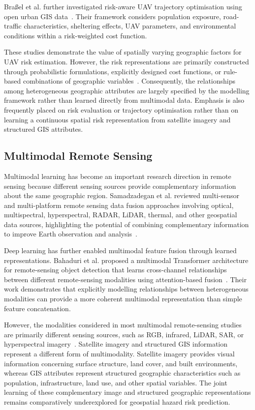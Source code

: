 \documentclass[sigconf, review=true]{acmart}
\begin{document}
Bra{\ss}el et al. further investigated risk-aware UAV trajectory optimisation using open urban GIS data~\cite{brassel2025riskaware}. Their framework considers population exposure, road-traffic characteristics, sheltering effects, UAV parameters, and environmental conditions within a risk-weighted cost function.

These studies demonstrate the value of spatially varying geographic factors for UAV risk estimation. However, the risk representations are primarily constructed through probabilistic formulations, explicitly designed cost functions, or rule-based combinations of geographic variables~\cite{primatesta2020groundrisk,zhou2025riskbased,brassel2025riskaware}. Consequently, the relationships among heterogeneous geographic attributes are largely specified by the modelling framework rather than learned directly from multimodal data. Emphasis is also frequently placed on risk evaluation or trajectory optimisation rather than on learning a continuous spatial risk representation from satellite imagery and structured GIS attributes.

\subsection{Multimodal Remote Sensing}

Multimodal learning has become an important research direction in remote sensing because different sensing sources provide complementary information about the same geographic region. Samadzadegan et al. reviewed multi-sensor and multi-platform remote sensing data fusion approaches involving optical, multispectral, hyperspectral, RADAR, LiDAR, thermal, and other geospatial data sources, highlighting the potential of combining complementary information to improve Earth observation and analysis~\cite{samadzadegan2025fusion}.

Deep learning has further enabled multimodal feature fusion through learned representations. Bahaduri et al. proposed a multimodal Transformer architecture for remote-sensing object detection that learns cross-channel relationships between different remote-sensing modalities using attention-based fusion~\cite{bahaduri2024multimodal}. Their work demonstrates that explicitly modelling relationships between heterogeneous modalities can provide a more coherent multimodal representation than simple feature concatenation.

However, the modalities considered in most multimodal remote-sensing studies are primarily different sensing sources, such as RGB, infrared, LiDAR, SAR, or hyperspectral imagery~\cite{samadzadegan2025fusion,bahaduri2024multimodal}. Satellite imagery and structured GIS information represent a different form of multimodality. Satellite imagery provides visual information concerning surface structure, land cover, and built environments, whereas GIS attributes represent structured geographic characteristics such as population, infrastructure, land use, and other spatial variables. The joint learning of these complementary image and structured geographic representations remains comparatively underexplored for geospatial hazard risk prediction.
\end{document}
